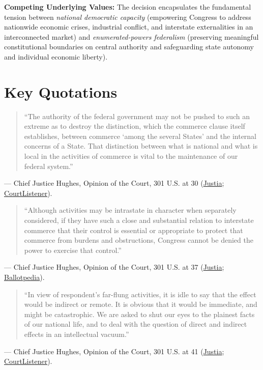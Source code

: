 \documentclass[12pt]{article}
\begin{document}
\textbf{Competing Underlying Values:} The decision encapsulates the fundamental tension between \textit{national democratic capacity} (empowering Congress to address nationwide economic crises, industrial conflict, and interstate externalities in an interconnected market) and \textit{enumerated-powers federalism} (preserving meaningful constitutional boundaries on central authority and safeguarding state autonomy and individual economic liberty).

\section{Key Quotations}

\begin{quote}
``The authority of the federal government may not be pushed to such an extreme as to destroy the distinction, which the commerce clause itself establishes, between commerce `among the several States' and the internal concerns of a State. That distinction between what is national and what is local in the activities of commerce is vital to the maintenance of our federal system.''
\end{quote}
\noindent --- Chief Justice Hughes, Opinion of the Court, 301 U.S. at 30 (\href{https://supreme.justia.com/cases/federal/us/301/1/}{Justia}; \href{https://www.courtlistener.com/opinion/102804/national-labor-relations-board-v-jones-laughlin-steel-corp/}{CourtListener}).

\begin{quote}
``Although activities may be intrastate in character when separately considered, if they have such a close and substantial relation to interstate commerce that their control is essential or appropriate to protect that commerce from burdens and obstructions, Congress cannot be denied the power to exercise that control.''
\end{quote}
\noindent --- Chief Justice Hughes, Opinion of the Court, 301 U.S. at 37 (\href{https://supreme.justia.com/cases/federal/us/301/1/}{Justia}; \href{https://ballotpedia.org/National_Labor_Relations_Board_v._Jones_\%26_Laughlin_Steel_Corporation}{Ballotpedia}).

\begin{quote}
``In view of respondent's far-flung activities, it is idle to say that the effect would be indirect or remote. It is obvious that it would be immediate, and might be catastrophic. We are asked to shut our eyes to the plainest facts of our national life, and to deal with the question of direct and indirect effects in an intellectual vacuum.''
\end{quote}
\noindent --- Chief Justice Hughes, Opinion of the Court, 301 U.S. at 41 (\href{https://supreme.justia.com/cases/federal/us/301/1/}{Justia}; \href{https://www.courtlistener.com/opinion/102804/national-labor-relations-board-v-jones-laughlin-steel-corp/}{CourtListener}).
\end{document}

